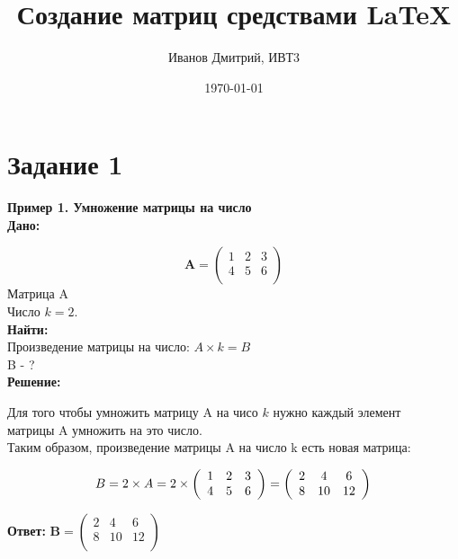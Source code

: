 \documentclass[a4paper,12pt]{article} %
\author{Иванов Дмитрий, ИВТ3}
\title{Создание матриц средствами \LaTeX}
\date{\today}
\begin{document}
\maketitle
\newpage
\section{Задание 1}
\textbf{Пример 1. Умножение матрицы на число} \\
\small{\textbf{Дано:}}

\begin{displaymath}
\mathbf{A} =
\left( \begin{array}{ccc}
1 & 2 & 3 \\
4 & 5 & 6 \\
\end{array} \right)
\end{displaymath}
Матрица A\\
Число $k=2$.\\
\small{\textbf{Найти:}}\\
Произведение матрицы на число: $A \times k = B$\\
B - ?\\
\textbf{Решение:}
\begin{flushleft}
Для того чтобы умножить матрицу A на чисо $k$ нужно каждый элемент\\
матрицы A умножить на это число.\\
Таким образом, произведение матрицы A на число k есть новая матрица:
\end{flushleft}


\begin{displaymath}    
B = 2 \times A = 2 \times  \left( \begin{array}{ccc}
1 & 2 & 3 \\
4 & 5 & 6 \\
\end{array} \right) = \left( \begin{array}{ccc}
2 & 4 & 6 \\
8 & 10 & 12 \\
\end{array} \right) \\ 
$$
\end{displaymath}

\textbf{Ответ:}
$\mathbf{B} =  \left( \begin{array}{ccc}
2 & 4 & 6 \\
8 & 10 & 12 \\\end{array} \right)$
\end{document}
